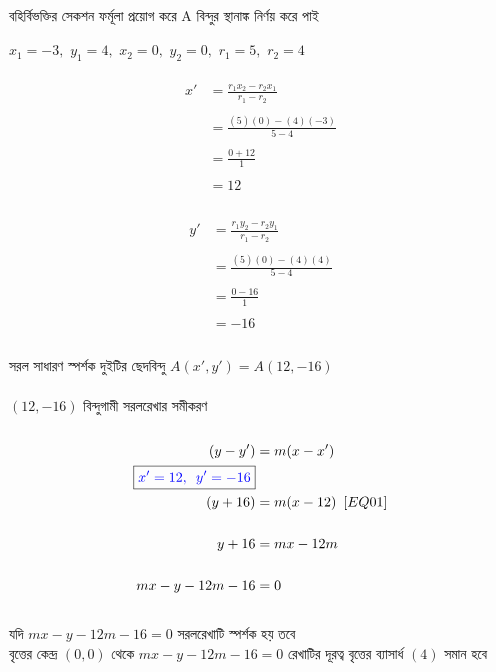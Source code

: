 \documentclass{article}
\begin{document}
বহির্বিভক্তির সেকশন ফর্মূলা প্রয়োগ করে A বিন্দুর স্থানাঙ্ক নির্ণয় করে পাই \\
\\ 
	$x_1=-3,\,\,y_1=4,\,\,x_2=0,\,\,y_2=0,\,\,r_1=5,\,\,r_2=4$\\
	\\
	\begin{align*}
		x'&=\frac{r_1x_2-r_2x_1}{r_1-r_2}\\
		\\
		&=\frac{(5)(0)-(4)(-3)}{5-4}\\
		\\
		&=\frac{0+12}{1}\\
		\\
		&=12\\
	\end{align*}
	\\
	\begin{align*}
		y'&=\frac{r_1y_2-r_2y_1}{r_1-r_2}\\
		\\
		&=\frac{(5)(0)-(4)(4)}{5-4}\\
		\\
		&=\frac{0-16}{1}\\
		\\
		&=-16\\
	\end{align*}
	\\
	সরল সাধারণ স্পর্শক দুইটির ছেদবিন্দু $A(x',y')=A(12,-16)$\\
	\\
	$(12,-16)$ বিন্দুগামী সরলরেখার  সমীকরণ \\
	\\ 
	\begin{align*}
		(y-y')&=m(x-x')\\
		\boxed{\textcolor{blue}{x'=12,\,\,\,y'=-16}}&\\
		(y+16)&=m(x-12)\,\,\,[EQ01]\\
		\\
		y+16&=mx-12m\\
		\\
		mx-y-12m-16&=0\\
	\end{align*}
	\\
	যদি $mx-y-12m-16=0$ সরলরেখাটি স্পর্শক হয় তবে \\
	বৃত্তের কেন্দ্র $(0,0)$ থেকে $mx-y-12m-16=0$ রেখাটির  দূরত্ব  বৃত্তের ব্যাসার্ধ $(4)$ সমান হবে \\
	\\  
\end{document}
